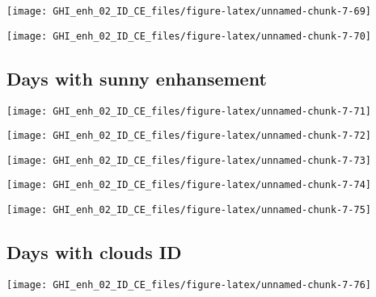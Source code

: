 \documentclass[
  10pt,
  a4paper,oneside]{article}
\begin{document}
\begin{center}\texttt{[image: GHI\_enh\_02\_ID\_CE\_files/figure-latex/unnamed-chunk-7-69]} \end{center}

\begin{center}\texttt{[image: GHI\_enh\_02\_ID\_CE\_files/figure-latex/unnamed-chunk-7-70]} \end{center}

\FloatBarrier

\hypertarget{days-with-sunny-enhansement}{%
\subsection{Days with sunny enhansement}\label{days-with-sunny-enhansement}}

\begin{center}\texttt{[image: GHI\_enh\_02\_ID\_CE\_files/figure-latex/unnamed-chunk-7-71]} \end{center}

\begin{center}\texttt{[image: GHI\_enh\_02\_ID\_CE\_files/figure-latex/unnamed-chunk-7-72]} \end{center}

\begin{center}\texttt{[image: GHI\_enh\_02\_ID\_CE\_files/figure-latex/unnamed-chunk-7-73]} \end{center}

\begin{center}\texttt{[image: GHI\_enh\_02\_ID\_CE\_files/figure-latex/unnamed-chunk-7-74]} \end{center}

\begin{center}\texttt{[image: GHI\_enh\_02\_ID\_CE\_files/figure-latex/unnamed-chunk-7-75]} \end{center}

\FloatBarrier

\hypertarget{days-with-clouds-id}{%
\subsection{Days with clouds ID}\label{days-with-clouds-id}}

\begin{center}\texttt{[image: GHI\_enh\_02\_ID\_CE\_files/figure-latex/unnamed-chunk-7-76]} \end{center}
\end{document}
